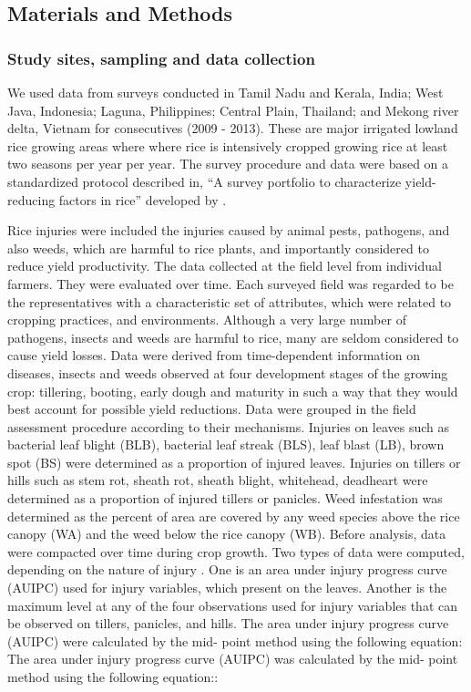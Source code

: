 \subsection{Materials and Methods}

\subsubsection{Study sites, sampling and data collection}
We used data from surveys conducted in Tamil Nadu  and Kerala, India; West Java, Indonesia; Laguna, Philippines; Central Plain, Thailand; and Mekong river delta, Vietnam for consecutives (2009 - 2013). These are major irrigated lowland rice growing areas where where rice is intensively cropped growing rice at least two seasons per year per year. The survey procedure and data were based on a standardized protocol described  in, ``A survey portfolio to characterize yield-reducing factors in rice'' developed by \citet{Savarysurvey2009}.

Rice injuries were included the injuries caused by animal pests, pathogens, and also weeds, which are harmful to rice plants, and importantly considered to reduce yield productivity. The data collected at the field level from individual farmers. They were evaluated over time. Each surveyed field was regarded to be the representatives with a characteristic set of attributes, which were related to cropping practices, and environments. Although a very large number of pathogens, insects and weeds are harmful to rice, many are seldom considered to cause yield losses. Data were derived from time-dependent information on diseases, insects and weeds observed at four development stages of the growing crop: tillering, booting, early dough and maturity in such a way that they would best account for possible yield reductions. Data were grouped in the field assessment procedure according to their mechanisms. Injuries on leaves such as bacterial leaf blight (BLB), bacterial leaf streak (BLS), leaf blast (LB), brown spot (BS) were determined as a proportion of injured leaves. Injuries on tillers or hills such as stem rot, sheath rot, sheath blight, whitehead, deadheart were determined as a proportion of injured tillers or panicles. Weed infestation was determined as the percent of area are covered by any weed species above the rice canopy (WA) and the weed below the rice canopy (WB). Before analysis, data were compacted over time during crop growth. Two types of data were computed, depending on the nature of injury \citep{Savarysurvey2009}. One is an area under injury progress curve (AUIPC) used for injury variables, which present on the leaves. Another is the maximum level at any of the four observations used for injury variables that can be observed on tillers, panicles, and hills. The area under injury progress curve (AUIPC) \citep{Campbell_1990_Introduction} were calculated by the mid- point method using the following equation: The area under injury progress curve (AUIPC) was calculated by the mid- point method using the following equation::

